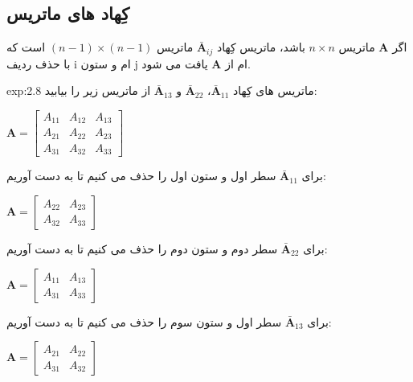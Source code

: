 \subsection{\textbf{کِهاد های ماتریس}}
{
    \Large
    \begin{spacing}{1.3}
        اگر $\textbf{A}$ ماتریس $n\times n$ باشد، ماتریس کِهاد $\bar{\textbf{A}}_{ij}$ ماتریس $(n-1)\times (n-1)$ است که با حذف ردیف i ام و ستون j ام از $\textbf{A}$ یافت می شود.

        \begin{example}{exp:2.8}
            \Large
            ماتریس های کِهاد $\bar{\textbf{A}}_{11}$، $\bar{\textbf{A}}_{22}$ و $\bar{\textbf{A}}_{13}$ از ماتریس زیر را بیابید:

            \begin{center}
                $\textbf{A}=\begin{bmatrix}
                                A_{11} & A_{12} & A_{13} \\
                                A_{21} & A_{22} & A_{23} \\
                                A_{31} & A_{32} & A_{33}
                \end{bmatrix}$
            \end{center}

            برای $\bar{\textbf{A}}_{11}$ سطر اول و ستون اول را حذف می کنیم تا به دست آوریم:

            \begin{center}
                $\textbf{A}=\begin{bmatrix}
                                A_{22} & A_{23} \\
                                A_{32} & A_{33}
                \end{bmatrix}$
            \end{center}

            برای $\bar{\textbf{A}}_{22}$ سطر دوم و ستون دوم را حذف می کنیم تا به دست آوریم:

            \begin{center}
                $\textbf{A}=\begin{bmatrix}
                                A_{11} & A_{13} \\
                                A_{31} & A_{33}
                \end{bmatrix}$
            \end{center}

            برای $\bar{\textbf{A}}_{13}$ سطر اول و ستون سوم را حذف می کنیم تا به دست آوریم:

            \begin{center}
                $\textbf{A}=\begin{bmatrix}
                                A_{21} & A_{22} \\
                                A_{31} & A_{32}
                \end{bmatrix}$
            \end{center}
        \end{example}
    \end{spacing}
}

